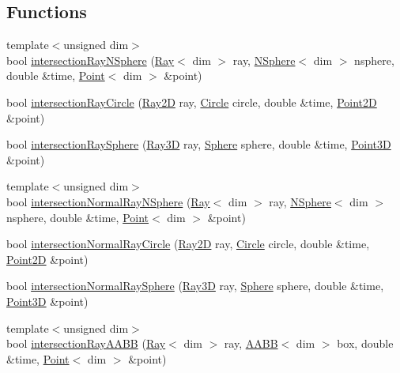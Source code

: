 \subsection*{Functions}
\begin{DoxyCompactItemize}
\item 
{\footnotesize template$<$unsigned dim$>$ }\\bool \hyperlink{namespacezbe_ac9a202f7547f1cb45f4c4afa11f81c3f}{intersection\+Ray\+N\+Sphere} (\hyperlink{structzbe_1_1_ray}{Ray}$<$ dim $>$ ray, \hyperlink{structzbe_1_1_n_sphere}{N\+Sphere}$<$ dim $>$ nsphere, double \&time, \hyperlink{classzbe_1_1_point}{Point}$<$ dim $>$ \&point)
\item 
bool \hyperlink{namespacezbe_ae0689e28c9b31335ae8710770472ecd9}{intersection\+Ray\+Circle} (\hyperlink{structzbe_1_1_ray2_d}{Ray2\+D} ray, \hyperlink{structzbe_1_1_circle}{Circle} circle, double \&time, \hyperlink{classzbe_1_1_point2_d}{Point2\+D} \&point)
\item 
bool \hyperlink{namespacezbe_ad51f308d977b5de5206de75a7cb9e39a}{intersection\+Ray\+Sphere} (\hyperlink{structzbe_1_1_ray3_d}{Ray3\+D} ray, \hyperlink{structzbe_1_1_sphere}{Sphere} sphere, double \&time, \hyperlink{classzbe_1_1_point3_d}{Point3\+D} \&point)
\item 
{\footnotesize template$<$unsigned dim$>$ }\\bool \hyperlink{namespacezbe_a49c30c9e5f53c2ea848f1bad7a876cde}{intersection\+Normal\+Ray\+N\+Sphere} (\hyperlink{structzbe_1_1_ray}{Ray}$<$ dim $>$ ray, \hyperlink{structzbe_1_1_n_sphere}{N\+Sphere}$<$ dim $>$ nsphere, double \&time, \hyperlink{classzbe_1_1_point}{Point}$<$ dim $>$ \&point)
\item 
bool \hyperlink{namespacezbe_aad46b4cfe1179f03ab2b129baed182d1}{intersection\+Normal\+Ray\+Circle} (\hyperlink{structzbe_1_1_ray2_d}{Ray2\+D} ray, \hyperlink{structzbe_1_1_circle}{Circle} circle, double \&time, \hyperlink{classzbe_1_1_point2_d}{Point2\+D} \&point)
\item 
bool \hyperlink{namespacezbe_a537d4ec3efdd4130bcbfda0f7f4a6c94}{intersection\+Normal\+Ray\+Sphere} (\hyperlink{structzbe_1_1_ray3_d}{Ray3\+D} ray, \hyperlink{structzbe_1_1_sphere}{Sphere} sphere, double \&time, \hyperlink{classzbe_1_1_point3_d}{Point3\+D} \&point)
\item 
{\footnotesize template$<$unsigned dim$>$ }\\bool \hyperlink{namespacezbe_adcf36e5bc580c6fdb219ae678717dda5}{intersection\+Ray\+A\+A\+B\+B} (\hyperlink{structzbe_1_1_ray}{Ray}$<$ dim $>$ ray, \hyperlink{structzbe_1_1_a_a_b_b}{A\+A\+B\+B}$<$ dim $>$ box, double \&time, \hyperlink{classzbe_1_1_point}{Point}$<$ dim $>$ \&point)

\end{DoxyCompactItemize}
